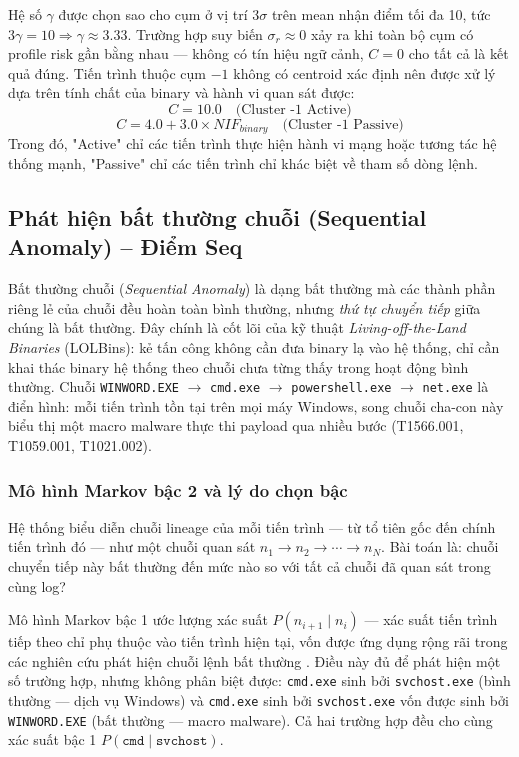 \documentclass[../main.tex]{subfiles}
\begin{document}
Hệ số $\gamma$ được chọn sao cho cụm ở vị trí $3\sigma$ trên mean nhận điểm tối đa 10, tức $3\gamma = 10 \Rightarrow \gamma \approx 3.33$. Trường hợp suy biến $\sigma_r \approx 0$ xảy ra khi toàn bộ cụm có profile risk gần bằng nhau — không có tín hiệu ngữ cảnh, $C = 0$ cho tất cả là kết quả đúng. Tiến trình thuộc cụm $-1$ không có centroid xác định nên được xử lý dựa trên tính chất của binary và hành vi quan sát được:
\begin{equation}
    C = 10.0 \quad \text{(Cluster -1 Active)} \tag{1.16}
\end{equation}
\begin{equation}
    C = 4.0 + 3.0 \times NIF_{binary} \quad \text{(Cluster -1 Passive)} \tag{1.17}
\end{equation}
Trong đó, "Active" chỉ các tiến trình thực hiện hành vi mạng hoặc tương tác hệ thống mạnh, "Passive" chỉ các tiến trình chỉ khác biệt về tham số dòng lệnh.

\subsection{Phát hiện bất thường chuỗi (Sequential Anomaly) – Điểm Seq}
\label{subsection:2.4.4}

Bất thường chuỗi (\textit{Sequential Anomaly}) là dạng bất thường mà các thành phần riêng lẻ của chuỗi đều hoàn toàn bình thường, nhưng \textit{thứ tự chuyển tiếp} giữa chúng là bất thường. Đây chính là cốt lõi của kỹ thuật \textit{Living-off-the-Land Binaries} (LOLBins): kẻ tấn công không cần đưa binary lạ vào hệ thống, chỉ cần khai thác binary hệ thống theo chuỗi chưa từng thấy trong hoạt động bình thường. Chuỗi \texttt{WINWORD.EXE} $\to$ \texttt{cmd.exe} $\to$ \texttt{powershell.exe} $\to$ \texttt{net.exe} là điển hình: mỗi tiến trình tồn tại trên mọi máy Windows, song chuỗi cha-con này biểu thị một macro malware thực thi payload qua nhiều bước (T1566.001, T1059.001, T1021.002).

\subsubsection{Mô hình Markov bậc 2 và lý do chọn bậc}
\label{subsubsection:2.4.4.1}

Hệ thống biểu diễn chuỗi lineage của mỗi tiến trình — từ tổ tiên gốc đến chính tiến trình đó — như một chuỗi quan sát $n_1 \to n_2 \to \cdots \to n_N$. Bài toán là: chuỗi chuyển tiếp này bất thường đến mức nào so với tất cả chuỗi đã quan sát trong cùng log?

Mô hình Markov bậc 1 ước lượng xác suất $P(n_{i+1} \mid n_i)$ — xác suất tiến trình tiếp theo chỉ phụ thuộc vào tiến trình hiện tại, vốn được ứng dụng rộng rãi trong các nghiên cứu phát hiện chuỗi lệnh bất thường \cite{tian2008}. Điều này đủ để phát hiện một số trường hợp, nhưng không phân biệt được: \texttt{cmd.exe} sinh bởi \texttt{svchost.exe} (bình thường — dịch vụ Windows) và \texttt{cmd.exe} sinh bởi \texttt{svchost.exe} vốn được sinh bởi \texttt{WINWORD.EXE} (bất thường — macro malware). Cả hai trường hợp đều cho cùng xác suất bậc 1 $P(\texttt{cmd} \mid \texttt{svchost})$.
\end{document}
